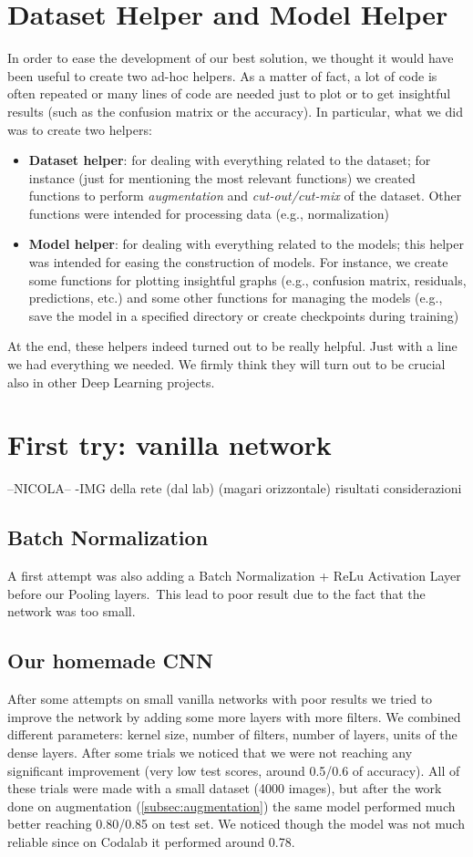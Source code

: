 \documentclass[10pt]{article}
\begin{document}
\section{Dataset Helper and Model Helper}
In order to ease the development of our best solution, we thought it would have been useful to create two ad-hoc helpers. As a matter of fact, a lot of code is often repeated or many lines of code are needed just to plot or to get insightful results (such as the confusion matrix or the accuracy). In particular, what we did was to create two helpers:
\begin{itemize}
    \item \textbf{Dataset helper}: for dealing with everything related to the dataset; for instance (just for mentioning the most relevant functions) we created functions to perform \textit{augmentation} and \textit{cut-out/cut-mix} of the dataset. Other functions were intended for processing data (e.g., normalization)
    \item \textbf{Model helper}: for dealing with everything related to the models; this helper was intended for easing the construction of models. For instance, we create some functions for plotting insightful graphs (e.g., confusion matrix, residuals, predictions, etc.) and some other functions for managing the models (e.g., save the model in a specified directory or create checkpoints during training)
\end{itemize}
At the end, these helpers indeed turned out to be really helpful. Just with a line we had everything we needed. We firmly think they will turn out to be crucial also in other Deep Learning projects.

\section{First try: vanilla network}
--NICOLA--
-IMG della rete (dal lab) (magari orizzontale)
risultati
considerazioni
\subsection{Batch Normalization}
A first attempt was also adding a Batch Normalization + ReLu Activation Layer before our Pooling layers.\
This lead to poor result due to the fact that the network was too small.

\subsection{Our homemade CNN}
After some attempts on small vanilla networks with poor results we tried to improve the network by adding some more layers with more filters.
We combined different parameters: kernel size, number of filters, number of layers, units of the dense layers.
After some trials we noticed that we were not reaching any significant improvement (very low test scores, around 0.5/0.6 of accuracy).
All of these trials were made with a small dataset (4000 images), but after the work done on augmentation (\ref{subsec:augmentation}) the same model performed much better reaching 0.80/0.85 on test set.
We noticed though the model was not much reliable since on Codalab it performed around 0.78.
\end{document}
